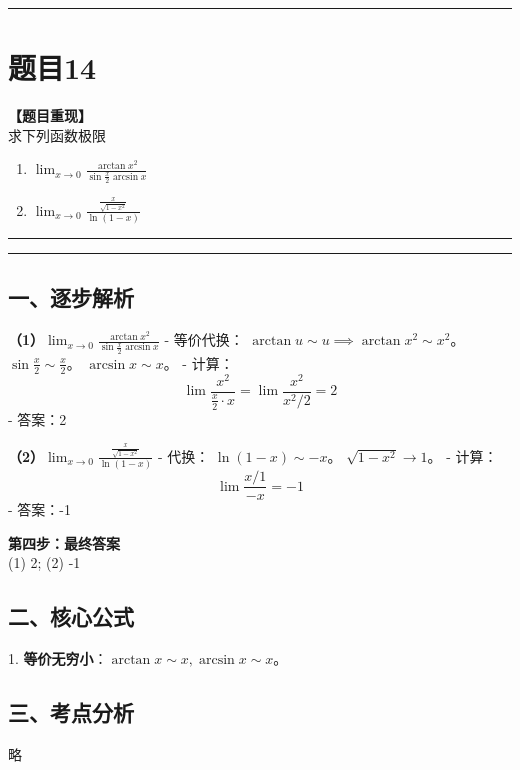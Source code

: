 \documentclass[12pt, a4paper]{ctexart}
\newcommand{\TopSeparator}{
    \par\noindent\rule{\textwidth}{1.5pt}\vspace{0.5em} %
}
\newcommand{\AnalysisSeparator}{
    \par\noindent\rule{\textwidth}{0.5pt}\vspace{0.2em}\hrule\vspace{0.5em} %
}
\newenvironment{RedAnalysis}{
    \par
    \color{red} %
}{
    \par
    \color{black} %
}
\begin{document}
\vspace{2em}

\TopSeparator
\section*{题目14}

\textbf{【题目重现】} \\
求下列函数极限
\begin{enumerate}
    \item $ \lim_{x\to0} \frac{\arctan x^{2}}{\sin\frac{x}{2}\arcsin x} $
    \item $ \lim_{x \to 0} \frac{\frac{x}{\sqrt{1-x^{2}}}}{\ln(1-x)} $
\end{enumerate}

\AnalysisSeparator

\begin{RedAnalysis}

\subsection*{一、逐步解析}

\textbf{（1）$ \lim_{x\to0} \frac{\arctan x^{2}}{\sin\frac{x}{2}\arcsin x} $}
   - 等价代换：
     $\arctan u \sim u \implies \arctan x^2 \sim x^2$。
     $\sin \frac{x}{2} \sim \frac{x}{2}$。
     $\arcsin x \sim x$。
   - 计算：
     \[ \lim \frac{x^2}{\frac{x}{2} \cdot x} = \lim \frac{x^2}{x^2/2} = 2 \]
   - 答案：2

\textbf{（2）$ \lim_{x \to 0} \frac{\frac{x}{\sqrt{1-x^{2}}}}{\ln(1-x)} $}
   - 代换：
     $\ln(1-x) \sim -x$。
     $\sqrt{1-x^2} \to 1$。
   - 计算：
     \[ \lim \frac{x/1}{-x} = -1 \]
   - 答案：-1

\textbf{第四步：最终答案} \\
(1) 2; (2) -1

\subsection*{二、核心公式}
1. \textbf{等价无穷小}：$\arctan x \sim x, \arcsin x \sim x$。

\subsection*{三、考点分析}
略

\end{RedAnalysis}

\vspace{2em}
\end{document}

